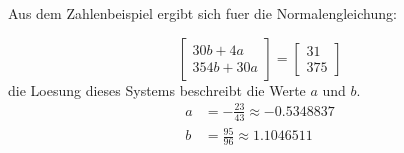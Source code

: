 \documentclass[11pt]{article}
\theoremstyle{plain}
\theoremstyle{definition}
\begin{document}
Aus dem Zahlenbeispiel ergibt sich fuer die Normalengleichung:

\begin{equation}
\begin{bmatrix} 30b + 4a \\ 354b + 30a \end{bmatrix} = \begin{bmatrix} 31 \\ 375 \end{bmatrix}
\end{equation}
die Loesung dieses Systems beschreibt die Werte $a$ und $b$.
\begin{align}
  a &= -\frac{23}{43} \approx -0.5348837 \\
  b &= \frac{95}{96} \approx 1.1046511
\end{align}
\end{document}
